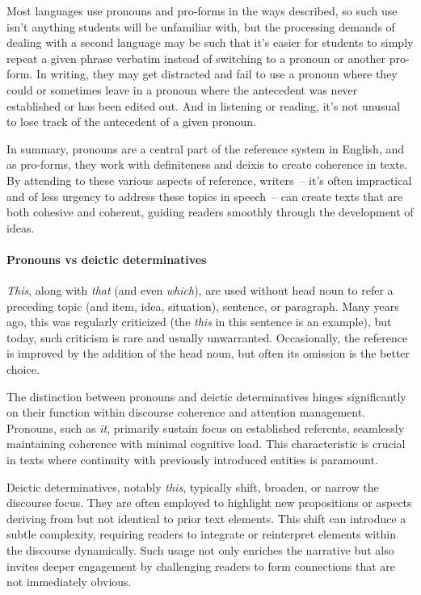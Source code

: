 Most languages use pronouns and pro-forms in the ways described, so such use isn't anything students will be unfamiliar with, but the processing demands of dealing with a second language may be such that it's easier for students to simply repeat a given phrase verbatim instead of switching to a pronoun or another pro-form. In writing, they may get distracted and fail to use a pronoun where they could or sometimes leave in a pronoun where the antecedent was never established or has been edited out. And in listening or reading, it's not unusual to lose track of the antecedent of a given pronoun.

In summary, pronouns are a central part of the reference system in English, and as pro-forms, they work with definiteness and deixis to create coherence in texts. By attending to these various aspects of reference, writers~-- it's often impractical and of less urgency to address these topics in speech~-- can create texts that are both cohesive and coherent, guiding readers smoothly through the development of ideas.

\paragraph*{Pronouns vs deictic determinatives}
\textit{This}, along with \textit{that} (and even \textit{which}), are used without head noun to refer a preceding topic (and item, idea, situation), sentence, or paragraph. Many years ago, this was regularly criticized (the \textit{this} in this sentence is an example), but today, such criticism is rare and usually unwarranted. Occasionally, the reference is improved by the addition of the head noun, but often its omission is the better choice.

The distinction between pronouns and deictic determinatives hinges significantly on their function within discourse coherence and attention management. Pronouns, such as \textit{it}, primarily sustain focus on established referents, seamlessly maintaining coherence with minimal cognitive load. This characteristic is crucial in texts where continuity with previously introduced entities is paramount.

Deictic determinatives, notably \textit{this}, typically shift, broaden, or narrow the discourse focus. They are often employed to highlight new propositions or aspects deriving from but not identical to prior text elements. This shift can introduce a subtle complexity, requiring readers to integrate or reinterpret elements within the discourse dynamically. Such usage not only enriches the narrative but also invites deeper engagement by challenging readers to form connections that are not immediately obvious.

